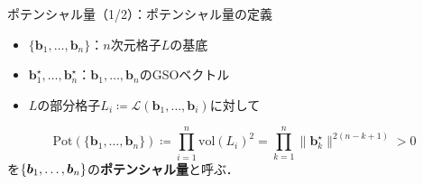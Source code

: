 \documentclass[12pt,aspectratio=169,xcolor=dvipsnames,table,dvipdfmx, leqno]{beamer}
\begin{document}
\begin{frame}{ポテンシャル量（1/2）：ポテンシャル量の定義}
\begin{Definition}[ポテンシャル量]
    \begin{itemize}
        \item $\{\bm{b}_1,\ldots,\bm{b}_n\}$：$n$次元格子$L$の基底
        \item $\bm{b}_1^\star,\ldots,\bm{b}_n^\star$：$\bm{b}_1,\ldots,\bm{b}_n$のGSOベクトル
        \item $L$の部分格子$L_i\coloneqq\mathcal{L}(\bm{b}_1,\ldots,\bm{b}_i)$に対して
    \end{itemize}
    \[
        \mathrm{Pot}(\{\bm{b}_1,\ldots,\bm{b}_n\}) \coloneqq \prod_{i=1}^n \mathrm{vol}(L_i)^2 = \prod_{k=1}^{n} \| \bm{b}_k^\star \|^{2(n-k+1)} > 0
    \]
    を$\qty{\bm{b}_1,\ldots,\bm{b}_n}$の\textbf{ポテンシャル量}と呼ぶ．
\end{Definition}
\end{frame}
\fi 
\end{document}
